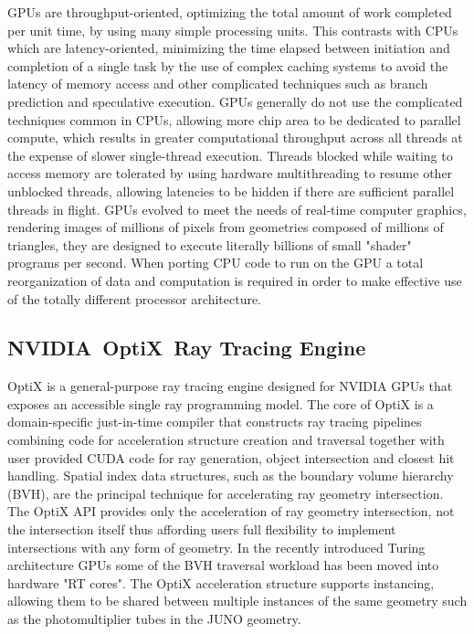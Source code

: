 \documentclass{webofc}
\begin{document}
GPUs are throughput-oriented\cite{throughput}, optimizing the total amount of work completed per unit time,
by using many simple processing units. This contrasts with CPUs which are latency-oriented, 
minimizing the time elapsed between initiation and completion of a single task by the use of complex
caching systems to avoid the latency of memory access and other complicated techniques such as branch prediction 
and speculative execution. GPUs generally do not use the complicated techniques common in CPUs, 
allowing more chip area to be dedicated to parallel compute, which results in greater computational throughput across 
all threads at the expense of slower single-thread execution.
Threads blocked while waiting to access memory are tolerated by using 
hardware multithreading to resume other unblocked threads, allowing latencies to be hidden if
there are sufficient parallel threads in flight. 
GPUs evolved to meet the needs of real-time computer graphics, rendering images of millions of pixels from geometries
composed of millions of triangles, they are designed to execute literally billions of small "shader" 
programs per second. When porting CPU code to run on the GPU a total reorganization of 
data and computation is required in order to make effective use of the totally different processor 
architecture.
%
\subsection{NVIDIA\textregistered\ OptiX\texttrademark\ Ray Tracing Engine}
%
OptiX is a general-purpose ray tracing engine
designed for NVIDIA GPUs that exposes an accessible single ray programming model.
The core of OptiX is a domain-specific just-in-time compiler that constructs 
ray tracing pipelines combining code for acceleration structure creation and traversal 
together with user provided CUDA code for ray generation, object intersection and closest hit handling.
Spatial index data structures, such as the boundary volume hierarchy (BVH), are the 
principal technique for accelerating ray geometry intersection.  The OptiX API\cite{optixDocs} 
provides only the acceleration of ray geometry intersection, not the intersection itself 
thus affording users full flexibility to implement intersections with any form of geometry. In the recently introduced Turing 
architecture GPUs some of the BVH traversal workload has been moved into hardware "RT cores"\cite{rtx}.
The OptiX acceleration structure supports instancing, allowing them to be shared 
between multiple instances of the same geometry such as the photomultiplier tubes in the JUNO geometry.  
%
\end{document}
